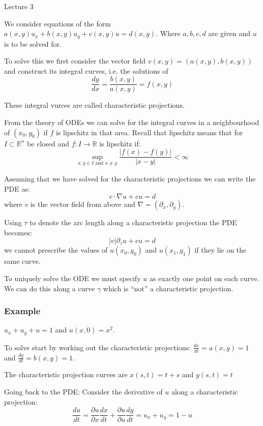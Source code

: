 \begin{center}

Lecture 3

\end{center}

We consider equations of the form $a(x,y) u_x + b(x,y) u_y + c(x,y) u = d(x,y)$. Where $a,b,c,d$ are given and $u$ is to be solved for.

To solve this we first consider the vector field $v(x,y) = (a(x,y), b(x,y))$ and construct its integral curves, i.e. the solutions of $$\frac{dy}{dx} = \frac{b(x,y)}{a(x,y)} = f(x,y)$$

These integral vurces are called characteristic projections.

From the theory of ODEs we can solve for the integral curves in a neighbourhood of $(x_0, y_0)$ if $f$ is lipschitz in that area. Recall that lipschitz means that for $I \subset \mathbb{R}^n$ be closed and $f: I \rightarrow \mathbb{R}$ is lipschitz if: $$\sup_{x,y \in I \, \, \text{and} \, \, x \neq y} \frac{|f(x) - f(y)|}{|x-y|} < \infty$$

Assuming that we have solved for the characteristic projections we can write the PDE as: $$v \cdot \nabla u + cu = d$$ where $v$ is the vector field from above and $\nabla = (\partial_x, \partial_y)$.

Using $\tau$ to denote the arc length along a characteristic projection the PDE becomes: $$|v| \partial_{\tau} u + cu = d$$ we cannot prescribe the values of $u(x_0, y_0)$ and $u(x_1, y_1)$ if they lie on the same curve. 

To uniquely solve the ODE we must specify $u$ as exactly one point on each curve. We can do this along a curve $\gamma$ which is ``not'' a characteristic projection.

\subsubsection*{Example}

$u_x + u_y + u = 1$ and $u(x,0)=x^2$.

To solve start by working out the characteristic projections: $\frac{dx}{dt} = a(x,y) = 1$ and $\frac{dy}{dt} = b(x,y) = 1$.

\vspace{\baselineskip}

The characteristic projection curves are $x(s,t) = t + s$ and $y(s,t) = t$

Going back to the PDE: Consider the derivative of $u$ along a characteristic projection: $$\frac{du}{dt} = \frac{\partial u}{\partial x} \frac{dx}{dt} + \frac{\partial u}{\partial u} \frac{dy}{dt} = u_x + u_y = 1 - u$$

